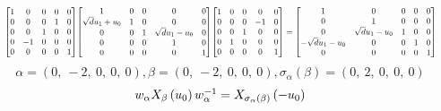 \documentclass[11pt]{article}
\theoremstyle{definition}
\begin{document}
\[
\scaletoalign{\textwidth}{{\left[\begin{matrix}1 & 0 & 0 & 0 & 0\\0 & 0 & 0 & 1 & 0\\0 & 0 & 1 & 0 & 0\\0 & -1 & 0 & 0 & 0\\0 & 0 & 0 & 0 & 1\end{matrix}\right]} {\left[\begin{matrix}1 & 0 & 0 & 0 & 0\\\sqrt{d} u_{1} + u_{0} & 1 & 0 & 0 & 0\\0 & 0 & 1 & \sqrt{d} u_{1} - u_{0} & 0\\0 & 0 & 0 & 1 & 0\\0 & 0 & 0 & 0 & 1\end{matrix}\right]} {\left[\begin{matrix}1 & 0 & 0 & 0 & 0\\0 & 0 & 0 & -1 & 0\\0 & 0 & 1 & 0 & 0\\0 & 1 & 0 & 0 & 0\\0 & 0 & 0 & 0 & 1\end{matrix}\right]} = {\left[\begin{matrix}1 & 0 & 0 & 0 & 0\\0 & 1 & 0 & 0 & 0\\0 & \sqrt{d} u_{1} - u_{0} & 1 & 0 & 0\\- \sqrt{d} u_{1} - u_{0} & 0 & 0 & 1 & 0\\0 & 0 & 0 & 0 & 1\end{matrix}\right]}}
\]
\[
\alpha = \left( 0, \  -2, \  0, \  0, \  0\right), \beta = \left( 0, \  -2, \  0, \  0, \  0\right), \sigma_{\alpha}(\beta) = \left( 0, \  2, \  0, \  0, \  0\right)
\]
\[
\scaletoalign{\textwidth}{w_{\alpha} X_{\beta}\left(u_{0}\right) w_{\alpha}^{-1} = X_{\sigma_{\alpha}\left(\beta\right)}\left(- u_{0}\right)}
\]
\end{document}
